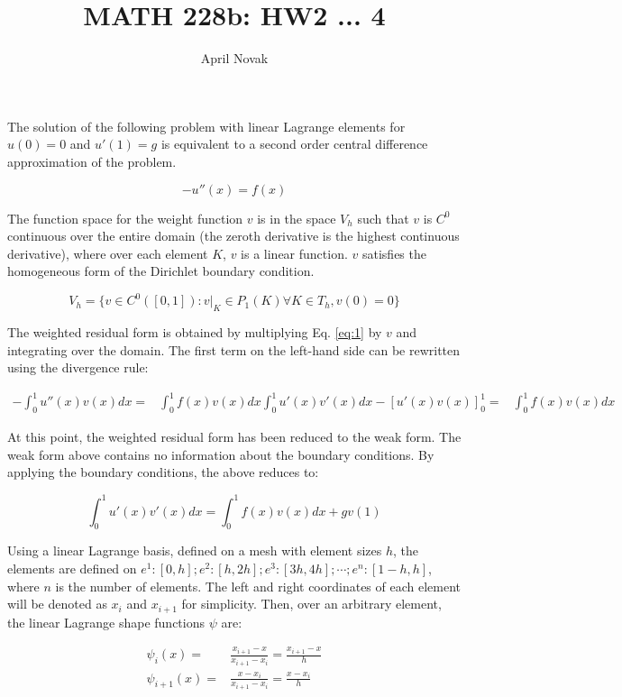 \documentclass[10pt]{article}
\newcommand{\beq}{\begin{equation}}
\newcommand{\eeq}{\end{equation}}
\newcommand{\beqa}{\begin{equation}\begin{aligned}}
\newcommand{\eeqa}{\end{aligned}\end{equation}}
\begin{document}
\title{MATH 228b: HW2 ... 4}
\author{April Novak}

\maketitle

\section{} 

The solution of the following problem with linear Lagrange elements for \(u(0)=0\) and \(u'(1)=g\) is equivalent to a second order central difference approximation of the problem. 

\beq
\label{eq:1}
-u''(x)=f(x)
\eeq

The function space for the weight function \(v\) is in the space \(V_h\) such that \(v\) is \(C^0\) continuous over the entire domain (the zeroth derivative is the highest continuous derivative), where over each element \(K\), \(v\) is a linear function. \(v\) satisfies the homogeneous form of the Dirichlet boundary condition.

\beq
V_h=\{v\in C^0([0,1]): v\rvert_K\in P_1(K) \forall K\in T_h, v(0)=0\}
\eeq

The weighted residual form is obtained by multiplying Eq. \eqref{eq:1} by \(v\) and integrating over the domain. The first term on the left-hand side can be rewritten using the divergence rule:

\beqa
-\int_0^1 u''(x)v(x)dx=& \int_0^1 f(x)v(x)dx
\int_0^1 u'(x)v'(x)dx-\left\lbrack u'(x)v(x)\right\rbrack_0^1=& \int_0^1 f(x)v(x)dx
\eeqa

At this point, the weighted residual form has been reduced to the weak form. The weak form above contains no information about the boundary conditions. By applying the boundary conditions, the above reduces to:

\beq
\int_0^1 u'(x)v'(x)dx=\int_0^1 f(x)v(x)dx+gv(1)
\eeq

Using a linear Lagrange basis, defined on a mesh with element sizes \(h\), the elements are defined on \(e^1: [0, h]; e^2: [h, 2h]; e^3: [3h, 4h]; \cdots; e^n: [1-h, h]\), where \(n\) is the number of elements. The left and right coordinates of each element will be denoted as \(x_i\) and \(x_{i+1}\) for simplicity. Then, over an arbitrary element, the linear Lagrange shape functions \(\psi\) are:

\beqa
\psi_i(x)=& \frac{x_{i+1}-x}{x_{i+1}-x_i}=\frac{x_{i+1}-x}{h}\\
\psi_{i+1}(x) =& \frac{x-x_i}{x_{i+1}-x_i}=\frac{x-x_i}{h}\\
\eeqa
\end{document}
